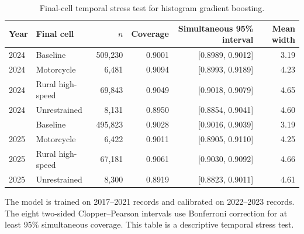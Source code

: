 \begin{table}[pos=htbp]
\caption{Final-cell temporal stress test for histogram gradient boosting.}
\label{tab:temporalcells}
\centering\footnotesize
\begin{threeparttable}
\begin{tabular}{llrrrr}
\toprule
Year & Final cell & $n$ & Coverage & Simultaneous 95\% interval & Mean width \\
\midrule
2024 & Baseline & 509,230 & 0.9001 & [0.8989, 0.9012] & 3.19 \\
2024 & Motorcycle & 6,481 & 0.9094 & [0.8993, 0.9189] & 4.23 \\
2024 & Rural high-speed & 69,843 & 0.9049 & [0.9018, 0.9079] & 4.65 \\
2024 & Unrestrained & 8,131 & 0.8950 & [0.8854, 0.9041] & 4.60 \\
\addlinespace
2025 & Baseline & 495,823 & 0.9028 & [0.9016, 0.9039] & 3.19 \\
2025 & Motorcycle & 6,422 & 0.9011 & [0.8905, 0.9110] & 4.25 \\
2025 & Rural high-speed & 67,181 & 0.9061 & [0.9030, 0.9092] & 4.66 \\
2025 & Unrestrained & 8,300 & 0.8919 & [0.8823, 0.9011] & 4.61 \\
\bottomrule
\end{tabular}
\begin{tablenotes}\footnotesize
\item The model is trained on 2017--2021 records and calibrated on 2022--2023 records. The eight two-sided Clopper--Pearson intervals use Bonferroni correction for at least 95\% simultaneous coverage. This table is a descriptive temporal stress test.
\end{tablenotes}
\end{threeparttable}
\end{table}
